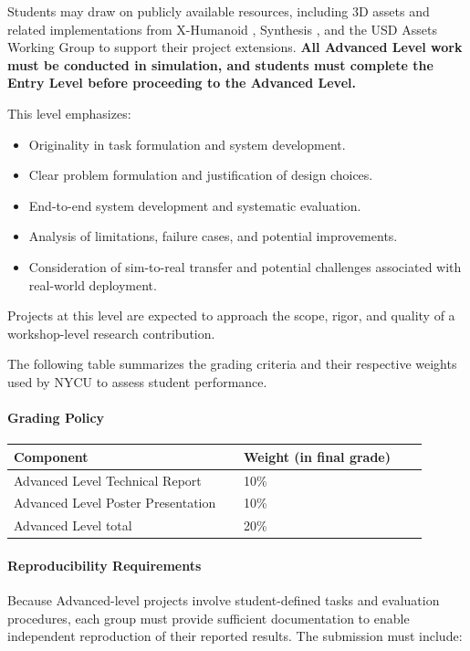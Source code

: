 \documentclass[11pt]{article}
\begin{document}
Students may draw on publicly available resources, including 3D assets and related implementations from X-Humanoid \cite{artvip_articulated_objects}, Synthesis \cite{synthesis}, and the USD Assets Working Group \cite{usd_assets_working_group} to support their project extensions. \textbf{All Advanced Level work must be conducted in simulation, and students must complete the Entry Level before proceeding to the Advanced Level.}

This level emphasizes:
\begin{itemize}
  \item Originality in task formulation and system development.
  \item Clear problem formulation and justification of design choices.
  \item End-to-end system development and systematic evaluation.
  \item Analysis of limitations, failure cases, and potential improvements.
  \item Consideration of sim-to-real transfer and potential challenges associated with real-world deployment.
\end{itemize}

Projects at this level are expected to approach the scope, rigor, and quality of a workshop-level research contribution.

\begin{tutornote}
\label{ttn:advanced-grading}
    The following table summarizes the grading criteria and their respective weights used by NYCU to assess student performance.
    \paragraph{Grading Policy}
    \begin{longtable}{L{0.5\linewidth}L{0.4\linewidth}}
    \toprule
    \textbf{Component} & \textbf{Weight (in final grade)}\\
    \midrule
    Advanced Level Technical Report & 10\% \\
    Advanced Level Poster Presentation & 10\% \\
    \midrule
    Advanced Level total & 20\% \\
    \bottomrule
    \end{longtable}
\end{tutornote}

\paragraph{Reproducibility Requirements}
Because Advanced-level projects involve student-defined tasks and evaluation procedures, each group must provide sufficient documentation to enable independent reproduction of their reported results. The submission must include:
\end{document}

